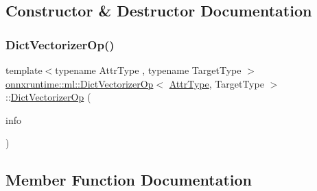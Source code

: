 \subsection{Constructor \& Destructor Documentation}
\mbox{\label{classonnxruntime_1_1ml_1_1DictVectorizerOp_aa94dc96b8541d7525374940254bd0e45}} 
\subsubsection{\texorpdfstring{Dict\+Vectorizer\+Op()}{DictVectorizerOp()}}
{\footnotesize\ttfamily template$<$typename Attr\+Type , typename Target\+Type $>$ \\
\mbox{\hyperlink{classonnxruntime_1_1ml_1_1DictVectorizerOp}{onnxruntime\+::ml\+::\+Dict\+Vectorizer\+Op}}$<$ \mbox{\hyperlink{namespaceonnxruntime_afb993460ae8432beef9db5f0cf10ca7c}{Attr\+Type}}, Target\+Type $>$\+::\mbox{\hyperlink{classonnxruntime_1_1ml_1_1DictVectorizerOp}{Dict\+Vectorizer\+Op}} (\begin{DoxyParamCaption}\item[{const \mbox{\hyperlink{classonnxruntime_1_1OpKernelInfo}{Op\+Kernel\+Info}} \&}]{info }\end{DoxyParamCaption})\hspace{0.3cm}{\ttfamily [inline]}}



\subsection{Member Function Documentation}
\mbox{\label{classonnxruntime_1_1ml_1_1DictVectorizerOp_ac7541aa5edf004dafc4132dfcc764865}} 
